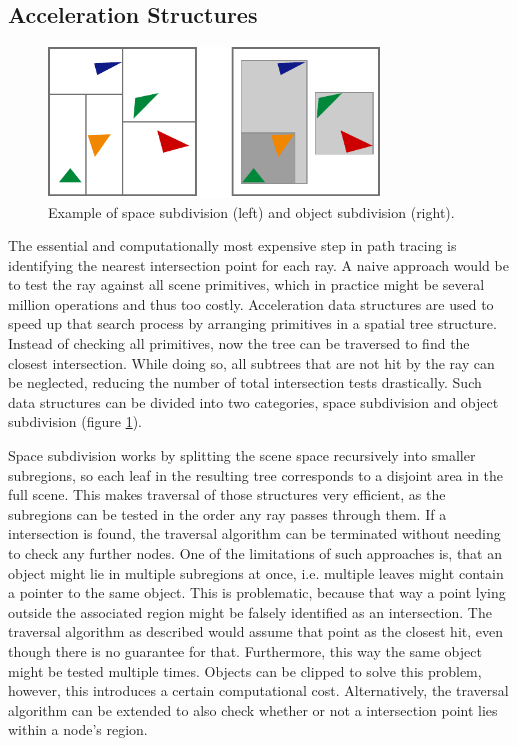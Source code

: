 \subsection{Acceleration Structures}
\label{acceleration_structure_basics}
\begin{figure}[H]
    \centering
    \includegraphics[width=250pt]{images/bvh_kd_tree.pdf}
    \caption{Example of space subdivision (left) and object subdivision (right).}
    \label{fig:subdiv}
\end{figure}
The essential and computationally most expensive step in path tracing is identifying the nearest intersection point for each ray. A naive approach would be to test the ray against all scene primitives, which in practice might be several million operations and thus too costly. Acceleration data structures are used to speed up that search process by arranging primitives in a spatial tree structure. Instead of checking all primitives, now the tree can be traversed to find the closest intersection. While doing so, all subtrees that are not hit by the ray can be neglected, reducing the number of total intersection tests drastically. Such data structures can be divided into two categories, space subdivision and object subdivision (figure \ref{fig:subdiv}). 

Space subdivision works by splitting the scene space recursively into smaller subregions, so each leaf in the resulting tree corresponds to a disjoint area in the full scene. This makes traversal of those structures very efficient, as the subregions can be tested in the order any ray passes through them. If a intersection is found, the traversal algorithm can be terminated without needing to check any further nodes. One of the limitations of such approaches is, that an object might lie in multiple subregions at once, i.e. multiple leaves might contain a pointer to the same object. This is problematic, because that way a point lying outside the associated region might be falsely identified as an intersection. The traversal algorithm as described would assume that point as the closest hit, even though there is no guarantee for that. Furthermore, this way the same object might be tested multiple times. Objects can be clipped to solve this problem, however, this introduces a certain computational cost. Alternatively, the traversal algorithm can be extended to also check whether or not a intersection point lies within a node's region. 

